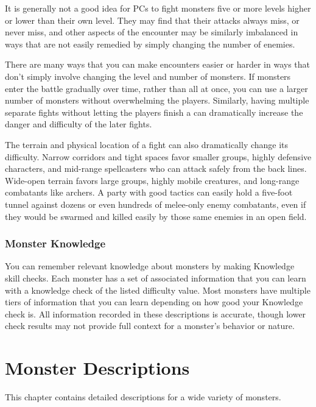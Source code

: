     It is generally not a good idea for PCs to fight monsters five or more levels higher or lower than their own level.
    They may find that their attacks always miss, or never miss, and other aspects of the encounter may be similarly imbalanced in ways that are not easily remedied by simply changing the number of enemies.

    There are many ways that you can make encounters easier or harder in ways that don't simply involve changing the level and number of monsters.
    If monsters enter the battle gradually over time, rather than all at once, you can use a larger number of monsters without overwhelming the players.
    Similarly, having multiple separate fights without letting the players finish a  can dramatically increase the danger and difficulty of the later fights.

    The terrain and physical location of a fight can also dramatically change its difficulty.
    Narrow corridors and tight spaces favor smaller groups, highly defensive characters, and mid-range spellcasters who can attack safely from the back lines.
    Wide-open terrain favors large groups, highly mobile creatures, and long-range combatants like archers.
    A party with good tactics can easily hold a five-foot tunnel against dozens or even hundreds of melee-only enemy combatants, even if they would be swarmed and killed easily by those same enemies in an open field.

  \subsection{Monster Knowledge}
    You can remember relevant knowledge about monsters by making Knowledge skill checks.
    Each monster has a set of associated information that you can learn with a knowledge check of the listed difficulty value.
    Most monsters have multiple tiers of information that you can learn depending on how good your Knowledge check is.
    All information recorded in these descriptions is accurate, though lower check results may not provide full context for a monster's behavior or nature.



%   

\chapter{Monster Descriptions}

  This chapter contains detailed descriptions for a wide variety of monsters.

  

